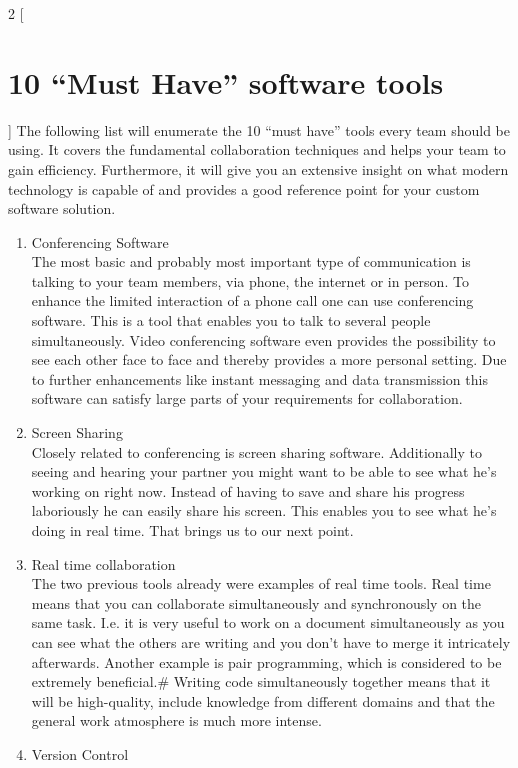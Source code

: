 \begin{multicols}{2}
[\section{10 “Must Have” software tools}]
The following list will enumerate the 10 “must have” tools every team should be using. It covers the fundamental collaboration techniques and helps your team to gain efficiency. Furthermore, it will give you an extensive insight on what modern technology is capable of and provides a good reference point for your custom software solution.
\begin{enumerate}[1.]
  \item Conferencing Software\\
The most basic and probably most important type of communication is talking to your team members, via phone, the internet or in person. To enhance the limited interaction of a phone call one can use conferencing software. This is a tool that enables you to talk to several people simultaneously. Video conferencing software even provides the possibility to see each other face to face and thereby provides a more personal setting. Due to further enhancements like instant messaging and data transmission this software can satisfy large parts of your requirements for collaboration.
  \item Screen Sharing\\
Closely related to conferencing is screen sharing software. Additionally to seeing and hearing your partner you might want to be able to see what he’s working on right now. Instead of having to save and share his progress laboriously he can easily share his screen. This enables you to see what he’s doing in real time. That brings us to our next point.
	\item Real time collaboration\\
The two previous tools already were examples of real time tools. Real time means that you can collaborate simultaneously and synchronously on the same task. I.e. it is very useful to work on a document simultaneously as you can see what the others are writing and you don’t have to merge it intricately afterwards. Another example is pair programming, which is considered to be extremely beneficial.# Writing code simultaneously together means that it will be high-quality, include knowledge from different domains and that the general work atmosphere is much more intense.
	\item Version Control\\

\end{enumerate}
\end{multicols}

